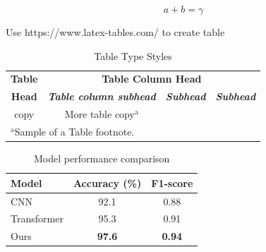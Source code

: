 
\begin{equation}
    a+b=\gamma\label{eq:name}
\end{equation}


Use https://www.latex-tables.com/ to create table

\begin{table}[htbp]
    \caption{Table Type Styles}
    \begin{center}
        \begin{tabular}{|c|c|c|c|}
            \hline
            \textbf{Table} & \multicolumn{3}{|c|}{\textbf{Table Column Head}}                                                         \\
            \cline{2-4}
            \textbf{Head}  & \textbf{\textit{Table column subhead}}           & \textbf{\textit{Subhead}} & \textbf{\textit{Subhead}} \\
            \hline
            copy           & More table copy$^{\mathrm{a}}$                   &                           &                           \\
            \hline
            \multicolumn{4}{l}{$^{\mathrm{a}}$Sample of a Table footnote.}
        \end{tabular}
        \label{tab1e:name}
    \end{center}
\end{table}

\begin{table}[htbp]
    \centering
    \caption{Model performance comparison}
    \begin{tabular}{lcc}
        \toprule
        \textbf{Model} & \textbf{Accuracy (\%)} & \textbf{F1-score} \\
        \midrule
        CNN            & 92.1                   & 0.88              \\
        Transformer    & 95.3                   & 0.91              \\
        Ours           & \textbf{97.6}          & \textbf{0.94}     \\
        \bottomrule
    \end{tabular}
    \label{tab:results}
\end{table}

